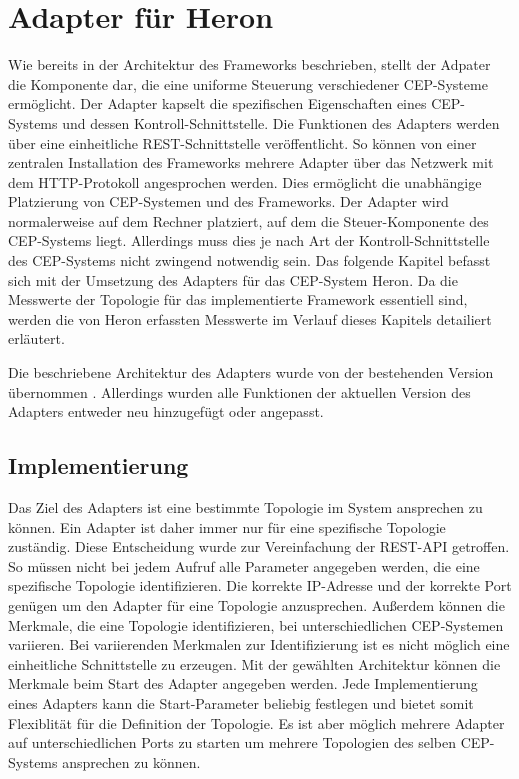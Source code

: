 \chapter{Adapter für Heron}

Wie bereits in der Architektur des Frameworks beschrieben, stellt der Adpater die Komponente dar, die eine uniforme Steuerung verschiedener CEP-Systeme ermöglicht.
Der Adapter kapselt die spezifischen Eigenschaften eines CEP-Systems und dessen Kontroll-Schnittstelle.
Die Funktionen des Adapters werden über eine einheitliche REST-Schnittstelle veröffentlicht.
So können von einer zentralen Installation des Frameworks mehrere Adapter über das Netzwerk mit dem HTTP-Protokoll angesprochen werden.
Dies ermöglicht die unabhängige Platzierung von CEP-Systemen und des Frameworks.
Der Adapter wird normalerweise auf dem Rechner platziert, auf dem die Steuer-Komponente des CEP-Systems liegt.
Allerdings muss dies je nach Art der Kontroll-Schnittstelle des CEP-Systems nicht zwingend notwendig sein.
Das folgende Kapitel befasst sich mit der Umsetzung des Adapters für das CEP-System Heron.
Da die Messwerte der Topologie für das implementierte Framework essentiell sind, werden die von Heron erfassten Messwerte im Verlauf dieses Kapitels detailiert erläutert.

Die beschriebene Architektur des Adapters wurde von der bestehenden Version übernommen \cite{goggel_vergleich_2018}.
Allerdings wurden alle Funktionen der aktuellen Version des Adapters entweder neu hinzugefügt oder angepasst.
 

\section{Implementierung}

Das Ziel des Adapters ist eine bestimmte Topologie im System ansprechen zu können.
Ein Adapter ist daher immer nur für eine spezifische Topologie zuständig.
Diese Entscheidung wurde zur Vereinfachung der REST-API getroffen.
So müssen nicht bei jedem Aufruf alle Parameter angegeben werden, die eine spezifische Topologie identifizieren.
Die korrekte IP-Adresse und der korrekte Port genügen um den Adapter für eine Topologie anzusprechen.
Außerdem können die Merkmale, die eine Topologie identifizieren, bei unterschiedlichen CEP-Systemen variieren.
Bei variierenden Merkmalen zur Identifizierung ist es nicht möglich eine einheitliche Schnittstelle zu erzeugen.
Mit der gewählten Architektur können die Merkmale beim Start des Adapter angegeben werden.
Jede Implementierung eines Adapters kann die Start-Parameter beliebig festlegen und bietet somit Flexiblität für die Definition der Topologie.
Es ist aber möglich mehrere Adapter auf unterschiedlichen Ports zu starten um mehrere Topologien des selben CEP-Systems ansprechen zu können.

